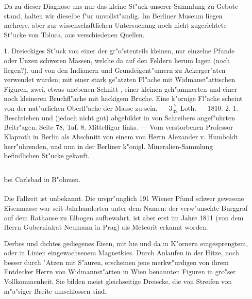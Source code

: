 \documentclass[a4paper, 11pt, oneside, polutonikogreek, german]{article}
\begin{document}
\setlength{\leftskip}{10mm}
\setlength{\parindent}{0pt}

{\footnotesize Da zu dieser Diagnose uns nur das kleine St"uck unserer Sammlung zu Gebote stand, halten wir dieselbe f"ur unvollst"andig. Im Berliner Museum liegen mehrere, aber zur wissenschaftlichen Untersuchung noch nicht zugerichtete St"ucke von Toluca, aus verschiedenen Quellen.}

\setlength{\leftskip}{0pt}
\setlength{\parindent}{20pt}

1. Dreieckiges St"uck von einer der gr"o"stenteils kleinen, nur einzelne Pfunde oder Unzen schweren Massen, welche da auf den Feldern herum lagen (noch liegen?), und von den Indianern und Grundeigent"umern zu Ackerger"aten verwendet wurden; mit einer stark ge"atzten Fl"ache mit Widmanst"attischen Figuren, zwei, etwas unebenen Schnitt-, einer kleinen geh"ammerten und einer noch kleineren Bruchfl"ache mit hackigem Bruche. Eine k"ornige Fl"ache scheint von der nat"urlichen Oberfl"ache der Masse zu sein. --- $3\frac{7}{32}$ Loth. --- 1810. 2. 1. --- Beschrieben und (jedoch nicht gut) abgebildet in von Schreibers angef"uhrten Beitr"agen, Seite 78, Taf. 8, Mittelfigur links. --- Vom verstorbenen Professor Klaproth in Berlin als Abschnitt von einem von Herrn Alexander v. Humboldt herr"uhrenden, und nun in der Berliner k"onigl. Mineralien-Sammlung befindlichen St"ucke gekauft.
\subsection[\frakfamily{Elbogen.}]{}
\begin{center}

bei Carlsbad in B"ohmen.
\end{center}
\paragraph{}
Die Fallzeit ist unbekannt. Die urspr"unglich 191 Wiener Pfund schwer gewesene Eisenmasse war seit Jahrhunderten unter dem Namen: der verw"unschte Burggraf auf dem Rathause zu Elbogen aufbewahrt, ist aber erst im Jahre 1811 (von dem Herrn Gubernialrat Neumann in Prag) als Meteorit erkannt worden.

Derbes und dichtes gediegenes Eisen, mit hie und da in K"ornern eingesprengtem, oder in Linien eingewachsenem Magnetkies. Durch Anlaufen in der Hitze, noch besser durch "Atzen mit S"auren, erscheinen jene merkw"urdigen von ihrem Entdecker Herrn von Widmannst"atten in Wien benannten Figuren in gro"ser Vollkommenheit. Sie bilden meist gleichseitige Dreiecke, die von Streifen von m"a"siger Breite umschlossen sind.
\end{document}
